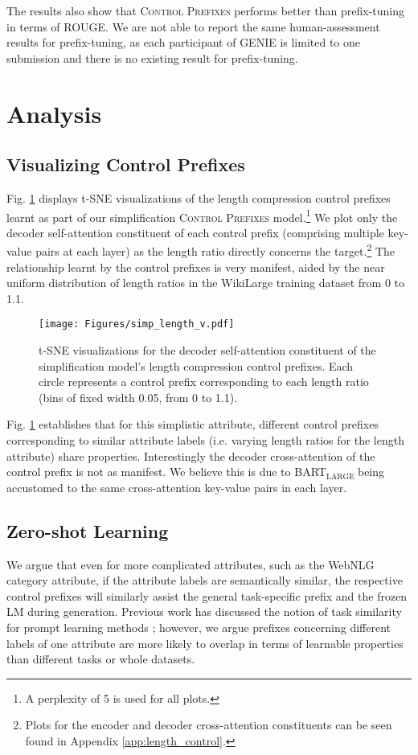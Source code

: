 \documentclass[11pt]{article}
\newcommand{\control}{\textsc{Control Prefixes}\xspace}
\newcommand{\bartl}{BART$_{\text {LARGE }}$}
\begin{document}
The results also show that \control performs better than prefix-tuning in terms of ROUGE. We are not able to report the same human-assessment results for prefix-tuning, as each participant of GENIE is limited to one submission and there is no existing result for prefix-tuning.


\section{Analysis}

\subsection{Visualizing Control Prefixes}
\label{sec:visual}
Fig. \ref{fig:tsne} displays t-SNE \citep{tsne_orig} visualizations of the length compression control prefixes learnt as part of our simplification \control model.\footnote{A perplexity of 5 is used for all plots.} We plot only the decoder self-attention constituent of each control prefix (comprising multiple key-value pairs at each layer) as the length ratio directly concerns the target.\footnote{Plots for the encoder and decoder cross-attention constituents can be seen found in Appendix \ref{app:length_control}.} The relationship learnt by the control prefixes is very manifest, aided by the near uniform distribution of length ratios in the WikiLarge training dataset from 0 to 1.1. 

\begin{figure}[ht!]
    \centering
            
    \texttt{[image: Figures/simp\_length\_v.pdf]}
    
    \caption{t-SNE visualizations for the decoder self-attention constituent of the simplification model's length compression control prefixes. Each circle represents a control prefix corresponding to each length ratio (bins of fixed width 0.05, from 0 to 1.1). \label{fig:tsne}
    }
\end{figure}


Fig. \ref{fig:tsne} establishes that for this simplistic attribute, different control prefixes corresponding to similar attribute labels (i.e. varying length ratios for the length attribute) share properties. Interestingly the decoder cross-attention of the control prefix is not as manifest. We believe this is due to \bartl being accustomed to the same cross-attention key-value pairs in each layer.


\subsection{Zero-shot Learning}
\label{sec:zero}
We argue that even for more complicated attributes, such as the WebNLG category attribute, if the attribute labels are semantically similar, the respective control prefixes will similarly assist the general task-specific prefix and the frozen LM during generation. 
Previous work has discussed the notion of task similarity \citep{achille} for prompt learning methods \citep{lester}; however, we argue prefixes concerning different labels of one attribute are more likely to overlap in terms of learnable properties than different tasks or whole datasets. 
\end{document}
